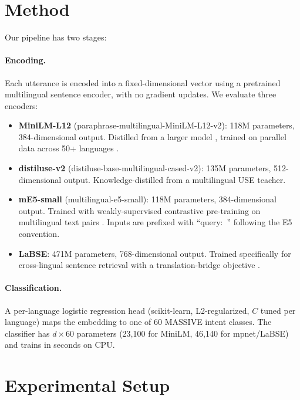 \documentclass[11pt]{article}
\begin{document}
\section{Method}

Our pipeline has two stages:

\paragraph{Encoding.} Each utterance is encoded into a fixed-dimensional vector using a pretrained multilingual sentence encoder, with no gradient updates. We evaluate three encoders:

\begin{itemize}
\item \textbf{MiniLM-L12} (paraphrase-multilingual-MiniLM-L12-v2): 118M parameters, 384-dimensional output. Distilled from a larger model \citep{wang2020minilm}, trained on parallel data across 50+ languages \citep{reimers2019sentencebert}.
\item \textbf{distiluse-v2} (distiluse-base-multilingual-cased-v2): 135M parameters, 512-dimensional output. Knowledge-distilled from a multilingual USE teacher.
\item \textbf{mE5-small} (multilingual-e5-small): 118M parameters, 384-dimensional output. Trained with weakly-supervised contrastive pre-training on multilingual text pairs \citep{wang2024e5}. Inputs are prefixed with ``query:~'' following the E5 convention.
\item \textbf{LaBSE}: 471M parameters, 768-dimensional output. Trained specifically for cross-lingual sentence retrieval with a translation-bridge objective \citep{feng2022labse}.
\end{itemize}

\paragraph{Classification.} A per-language logistic regression head (scikit-learn, L2-regularized, $C$ tuned per language) maps the embedding to one of 60 MASSIVE intent classes. The classifier has $d \times 60$ parameters (23,100 for MiniLM, 46,140 for mpnet/LaBSE) and trains in seconds on CPU.



\section{Experimental Setup}
\end{document}

